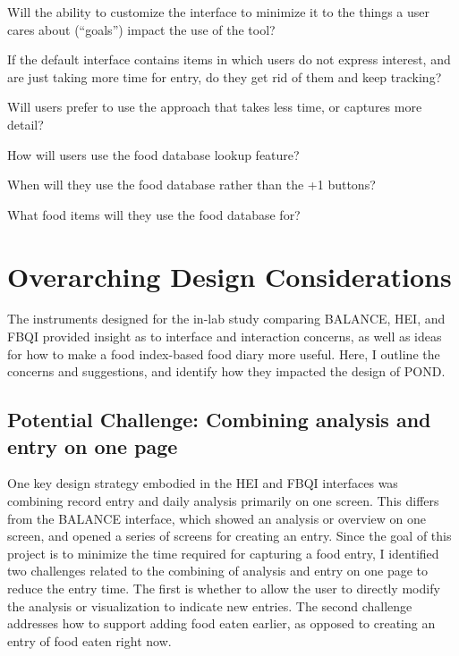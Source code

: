 \begin{itemize*}
\item Will the ability to customize the interface to minimize it to the things a user cares about (``goals'') impact the use of the tool? 
\item If the default interface contains items in which users do not express interest, and are just taking more time for entry, do they get rid of them and keep tracking? 
\item Will users prefer to use the approach that takes less time, or captures more detail?  
\item How will users use the food database lookup feature? 
\item\begin{itemize*}
\item When will they use the food database rather than the +1 buttons?
\item What food items will they use the food database for? 
\end{itemize*}
\end{itemize*}

\section{Overarching Design Considerations}

The instruments designed for the in-lab study comparing BALANCE, HEI, and FBQI provided insight as to interface and interaction concerns, as well as ideas for how to make a food index-based food diary more useful. Here, I outline the concerns and suggestions, and identify how they impacted the design of POND. 


\subsection{Potential Challenge: Combining analysis and entry on one page} 

One key design strategy embodied in the HEI and FBQI interfaces was combining record entry and daily analysis primarily on one screen. This differs from the BALANCE interface, which showed an analysis or overview on one screen, and opened a series of screens for creating an entry. Since the goal of this project is to minimize the time required for capturing a food entry, I identified two challenges related to the combining of analysis and entry on one page to reduce the entry time. The first is whether to allow the user to directly modify the analysis or visualization to indicate new entries. The second challenge addresses how to support adding food eaten earlier, as opposed to creating an entry of food eaten right now. 


